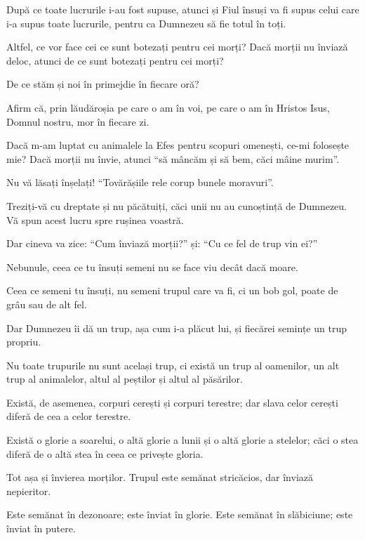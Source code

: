 {După ce toate lucrurile i-au fost supuse, atunci și Fiul însuși va fi supus celui care i-a supus toate lucrurile, pentru ca Dumnezeu să fie totul în toți.


\par }{\PP {}Altfel, ce vor face cei ce sunt botezați pentru cei morți? Dacă morții nu înviază deloc, atunci de ce sunt botezați pentru cei morți?

De ce stăm și noi în primejdie în fiecare oră?

Afirm că, prin lăudăroșia pe care o am în voi, pe care o am în Hristos Isus, Domnul nostru, mor în fiecare zi.

Dacă m-am luptat cu animalele la Efes pentru scopuri omenești, ce-mi folosește mie? Dacă morții nu învie, atunci “să mâncăm și să bem, căci mâine murim”.

Nu vă lăsați înșelați! “Tovărășiile rele corup bunele moravuri”.

Treziți-vă cu dreptate și nu păcătuiți, căci unii nu au cunoștință de Dumnezeu. Vă spun acest lucru spre rușinea voastră.


\par }{\PP {}Dar cineva va zice: “Cum înviază morții?” și: “Cu ce fel de trup vin ei?”

Nebunule, ceea ce tu însuți semeni nu se face viu decât dacă moare.

Ceea ce semeni tu însuți, nu semeni trupul care va fi, ci un bob gol, poate de grâu sau de alt fel.

Dar Dumnezeu îi dă un trup, așa cum i-a plăcut lui, și fiecărei semințe un trup propriu.

Nu toate trupurile nu sunt același trup, ci există un trup al oamenilor, un alt trup al animalelor, altul al peștilor și altul al păsărilor.

Există, de asemenea, corpuri cerești și corpuri terestre; dar slava celor cerești diferă de cea a celor terestre.

Există o glorie a soarelui, o altă glorie a lunii și o altă glorie a stelelor; căci o stea diferă de o altă stea în ceea ce privește gloria.


\par }{\PP {}Tot așa și învierea morților. Trupul este semănat stricăcios, dar înviază nepieritor.

Este semănat în dezonoare; este înviat în glorie. Este semănat în slăbiciune; este înviat în putere.

}
